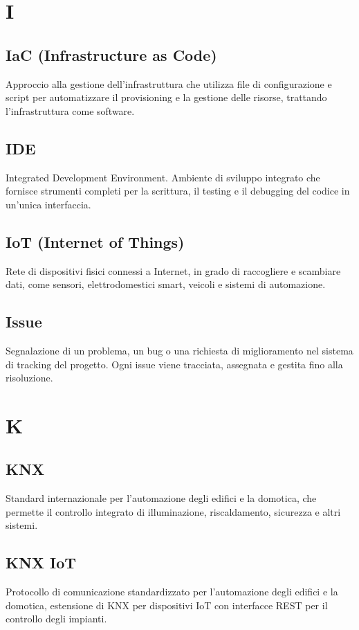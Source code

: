 \documentclass[a4paper,11pt]{article}
\begin{document}
\newpage
\section{I}

\subsection{IaC (Infrastructure as Code)}
Approccio alla gestione dell'infrastruttura che utilizza file di configurazione e script per automatizzare il provisioning e la gestione delle risorse, trattando l'infrastruttura come software.

\subsection{IDE}
Integrated Development Environment. Ambiente di sviluppo integrato che fornisce strumenti completi per la scrittura, il testing e il debugging del codice in un'unica interfaccia.

\subsection{IoT (Internet of Things)}
Rete di dispositivi fisici connessi a Internet, in grado di raccogliere e scambiare dati, come sensori, elettrodomestici smart, veicoli e sistemi di automazione.

\subsection{Issue}
Segnalazione di un problema, un bug o una richiesta di miglioramento nel sistema di tracking del progetto. Ogni issue viene tracciata, assegnata e gestita fino alla risoluzione.

\newpage
\section{K}

\subsection{KNX}
Standard internazionale per l'automazione degli edifici e la domotica, che permette il controllo integrato di illuminazione, riscaldamento, sicurezza e altri sistemi.

\subsection{KNX IoT}
Protocollo di comunicazione standardizzato per l'automazione degli edifici e la domotica, estensione di KNX per dispositivi IoT con interfacce REST per il controllo degli impianti.
\end{document}
